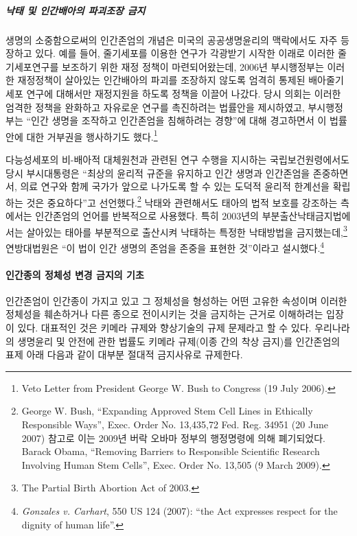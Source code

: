 \subparagraph{\texorpdfstring{ 낙태 및 인간배아의 파괴조장 금지}{ 낙태 및 인간배아의 파괴조장 금지}}

생명의 소중함으로써의 인간존엄의 개념은 미국의 공공생명윤리의 맥락에서도 자주 등장하고 있다. 예를 들어, 줄기세포를 이용한 연구가 각광받기 시작한 이래로 이러한 줄기세포연구를 보조하기 위한 재정 정책이 마련되어왔는데, 2006년 부시행정부는 이러한 재정정책이 살아있는 인간배아의 파괴를 조장하지 않도록 엄격히 통제된 배아줄기세포 연구에 대해서만 재정지원을 하도록 정책을 이끌어 나갔다. 당시 의회는 이러한 엄격한 정책을 완화하고 자유로운 연구를 촉진하려는 법률안을 제시하였고, 부시행정부는 ``인간 생명을 조작하고 인간존엄을 침해하려는 경향''에 대해 경고하면서 이 법률안에 대한 거부권을 행사하기도 했다.\footnote{Veto Letter from President George W. Bush to Congress (19 July 2006).}

다능성세포의 비-배아적 대체원천과 관련된 연구 수행을 지시하는 국립보건원령에서도 당시 부시대통령은 ``최상의 윤리적 규준을 유지하고 인간 생명과 인간존엄을 존중하면서, 의료 연구와 함께 국가가 앞으로 나가도록 할 수 있는 도덕적 윤리적 한계선을 확립하는 것은 중요하다''고 선언했다.\footnote{George W. Bush, ``Expanding Approved Stem Cell Lines in Ethically Responsible Ways'', Exec. Order No. 13,435,72 Fed. Reg. 34951 (20 June 2007) 참고로 이는 2009년 버락 오바마 정부의 행정명령에 의해 폐기되었다. Barack Obama, ``Removing Barriers to Responsible Scientific Research Involving Human Stem Cells'', Exec. Order No. 13,505 (9 March 2009).} 낙태와 관련해서도 태아의 법적 보호를 강조하는 측에서는 인간존엄의 언어를 반복적으로 사용했다. 특히 2003년의 부분출산낙태금지법에서는 살아있는 태아를 부분적으로 출산시켜 낙태하는 특정한 낙태방법을 금지했는데,\footnote{The Partial Birth Abortion Act of 2003.} 연방대법원은 ``이 법이 인간 생명의 존엄을 존중을 표현한 것''이라고 설시했다.\footnote{\emph{Gonzales v. Carhart}, 550 US 124 (2007): ``the Act expresses respect for the dignity of human life''.}

\paragraph{인간종의 정체성 변경 금지의 기초}

인간존엄이 인간종이 가지고 있고 그 정체성을 형성하는 어떤 고유한 속성이며 이러한 정체성을 훼손하거나 다른 종으로 전이시키는 것을 금지하는 근거로 이해하려는 입장이 있다. 대표적인 것은 키메라 규제와 향상기술의 규제 문제라고 할 수 있다. 우리나라의 생명윤리 및 안전에 관한 법률도 키메라 규제(이종 간의 착상 금지)를 인간존엄의 표제 아래 다음과 같이 대부분 절대적 금지사유로 규제한다.

